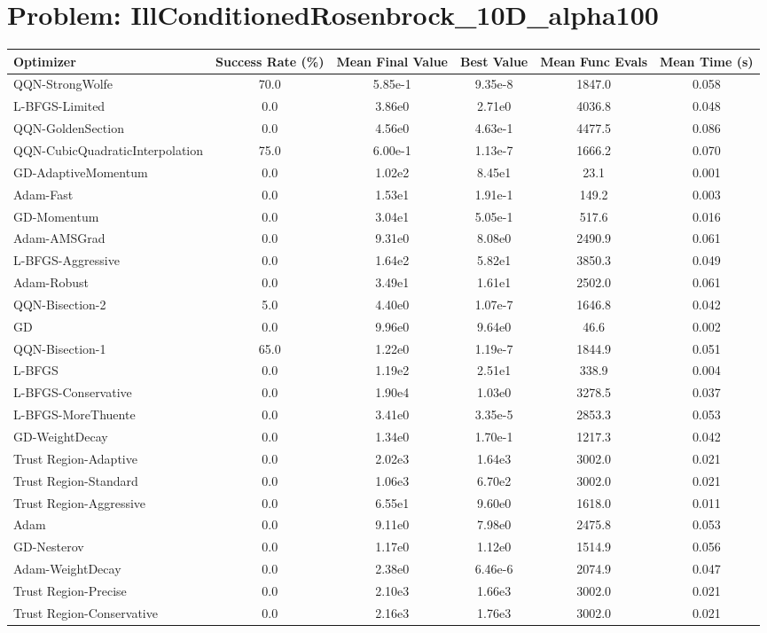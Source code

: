 \documentclass{article}
\begin{document}
\section{Problem: IllConditionedRosenbrock\_10D\_alpha100}
\begin{longtable}{p{3cm}*{5}{c}}
\toprule
\textbf{Optimizer} & \textbf{Success Rate (\%)} & \textbf{Mean Final Value} & \textbf{Best Value} & \textbf{Mean Func Evals} & \textbf{Mean Time (s)} \\
\midrule
QQN-StrongWolfe & 70.0 & 5.85e-1 & 9.35e-8 & 1847.0 & 0.058 \\
L-BFGS-Limited & 0.0 & 3.86e0 & 2.71e0 & 4036.8 & 0.048 \\
QQN-GoldenSection & 0.0 & 4.56e0 & 4.63e-1 & 4477.5 & 0.086 \\
QQN-CubicQuadraticInterpolation & 75.0 & 6.00e-1 & 1.13e-7 & 1666.2 & 0.070 \\
GD-AdaptiveMomentum & 0.0 & 1.02e2 & 8.45e1 & 23.1 & 0.001 \\
Adam-Fast & 0.0 & 1.53e1 & 1.91e-1 & 149.2 & 0.003 \\
GD-Momentum & 0.0 & 3.04e1 & 5.05e-1 & 517.6 & 0.016 \\
Adam-AMSGrad & 0.0 & 9.31e0 & 8.08e0 & 2490.9 & 0.061 \\
L-BFGS-Aggressive & 0.0 & 1.64e2 & 5.82e1 & 3850.3 & 0.049 \\
Adam-Robust & 0.0 & 3.49e1 & 1.61e1 & 2502.0 & 0.061 \\
QQN-Bisection-2 & 5.0 & 4.40e0 & 1.07e-7 & 1646.8 & 0.042 \\
GD & 0.0 & 9.96e0 & 9.64e0 & 46.6 & 0.002 \\
QQN-Bisection-1 & 65.0 & 1.22e0 & 1.19e-7 & 1844.9 & 0.051 \\
L-BFGS & 0.0 & 1.19e2 & 2.51e1 & 338.9 & 0.004 \\
L-BFGS-Conservative & 0.0 & 1.90e4 & 1.03e0 & 3278.5 & 0.037 \\
L-BFGS-MoreThuente & 0.0 & 3.41e0 & 3.35e-5 & 2853.3 & 0.053 \\
GD-WeightDecay & 0.0 & 1.34e0 & 1.70e-1 & 1217.3 & 0.042 \\
Trust Region-Adaptive & 0.0 & 2.02e3 & 1.64e3 & 3002.0 & 0.021 \\
Trust Region-Standard & 0.0 & 1.06e3 & 6.70e2 & 3002.0 & 0.021 \\
Trust Region-Aggressive & 0.0 & 6.55e1 & 9.60e0 & 1618.0 & 0.011 \\
Adam & 0.0 & 9.11e0 & 7.98e0 & 2475.8 & 0.053 \\
GD-Nesterov & 0.0 & 1.17e0 & 1.12e0 & 1514.9 & 0.056 \\
Adam-WeightDecay & 0.0 & 2.38e0 & 6.46e-6 & 2074.9 & 0.047 \\
Trust Region-Precise & 0.0 & 2.10e3 & 1.66e3 & 3002.0 & 0.021 \\
Trust Region-Conservative & 0.0 & 2.16e3 & 1.76e3 & 3002.0 & 0.021 \\
\bottomrule
\end{longtable}
\end{document}
